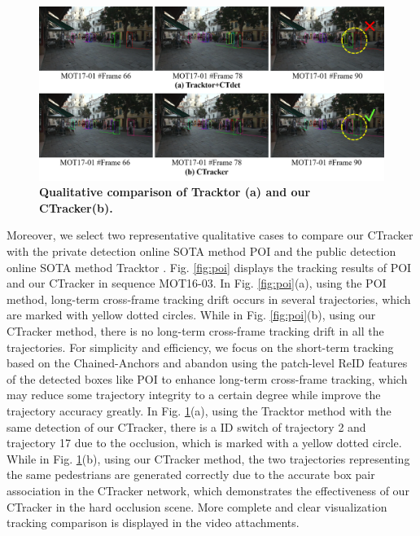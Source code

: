 \documentclass[crop=false]{standalone}
\begin{document}
\begin{figure}[t!]
\centering{}\includegraphics[width=0.98\columnwidth]{figure/tracktor.png}
\vspace{-5mm}
\caption{\label{fig:tracktor}\textbf{Qualitative comparison of Tracktor (a) and our CTracker(b).}}
\vspace{-0.04in}
\end{figure}

Moreover, we select two representative qualitative cases to compare our CTracker with the private detection online SOTA method POI \cite{yu2016poi} and the public detection online SOTA method Tracktor \cite{bergmann2019tracking}. Fig. \ref{fig:poi} displays the tracking results of POI and our CTracker in sequence MOT16-03. In Fig. \ref{fig:poi}(a), using the POI method, long-term cross-frame tracking drift occurs in several trajectories, which are marked with yellow dotted circles. While in Fig. \ref{fig:poi}(b), using our CTracker method, there is no long-term cross-frame tracking drift in all the trajectories. For simplicity and efficiency, we focus on the short-term tracking based on the Chained-Anchors and abandon using the patch-level ReID features of the detected boxes like POI to enhance long-term cross-frame tracking, which may reduce some trajectory integrity to a certain degree while improve the trajectory accuracy greatly. In Fig. \ref{fig:tracktor}(a), using the Tracktor method with the same detection of our CTracker, there is a ID switch of trajectory 2 and trajectory 17 due to the occlusion, which is marked with a yellow dotted circle. While in Fig. \ref{fig:tracktor}(b), using our CTracker method, the two trajectories representing the same pedestrians are generated correctly due to the accurate box pair association in the CTracker network, which demonstrates the effectiveness of our CTracker in the hard occlusion scene. More complete and clear visualization tracking comparison is displayed in the video attachments.
\end{document}
